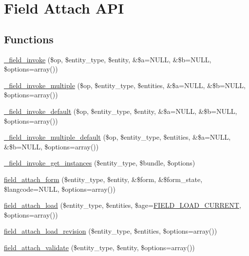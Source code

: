 \hypertarget{group__field__attach}{
\section{Field Attach API}
\label{group__field__attach}
}
\subsection*{Functions}
\begin{DoxyCompactItemize}
\item 
\hyperlink{group__field__attach_ga65f891a5eea6513f8505f5cfc5894896}{\_\-field\_\-invoke} (\$op, \$entity\_\-type, \$entity, \&\$a=NULL, \&\$b=NULL, \$options=array())
\item 
\hyperlink{group__field__attach_ga791aeba11e29038daf3e798dbea0df60}{\_\-field\_\-invoke\_\-multiple} (\$op, \$entity\_\-type, \$entities, \&\$a=NULL, \&\$b=NULL, \$options=array())
\item 
\hyperlink{group__field__attach_gaf000872e1850750f98445dfa96bfb602}{\_\-field\_\-invoke\_\-default} (\$op, \$entity\_\-type, \$entity, \&\$a=NULL, \&\$b=NULL, \$options=array())
\item 
\hyperlink{group__field__attach_gae25199cb48ebcbe016ed158985c755ef}{\_\-field\_\-invoke\_\-multiple\_\-default} (\$op, \$entity\_\-type, \$entities, \&\$a=NULL, \&\$b=NULL, \$options=array())
\item 
\hyperlink{group__field__attach_gac6a9d83062a9c3703f659bb2ccef3d76}{\_\-field\_\-invoke\_\-get\_\-instances} (\$entity\_\-type, \$bundle, \$options)
\item 
\hyperlink{group__field__attach_gac5bd0213dae78f7c1b3235f3acdde2c6}{field\_\-attach\_\-form} (\$entity\_\-type, \$entity, \&\$form, \&\$form\_\-state, \$langcode=NULL, \$options=array())
\item 
\hyperlink{group__field__attach_ga1e92543395961c912eb293b50e991586}{field\_\-attach\_\-load} (\$entity\_\-type, \$entities, \$age=\hyperlink{group__field_ga39b9fb0d47b181607a4d981a9bccbe8a}{FIELD\_\-LOAD\_\-CURRENT}, \$options=array())
\item 
\hyperlink{group__field__attach_gac79dd0f29910835c653b068233fa429b}{field\_\-attach\_\-load\_\-revision} (\$entity\_\-type, \$entities, \$options=array())
\item 
\hyperlink{group__field__attach_gae56981a9c1006e9c54f695f0ed515cd1}{field\_\-attach\_\-validate} (\$entity\_\-type, \$entity, \$options=array())
\item 

\end{DoxyCompactItemize}
